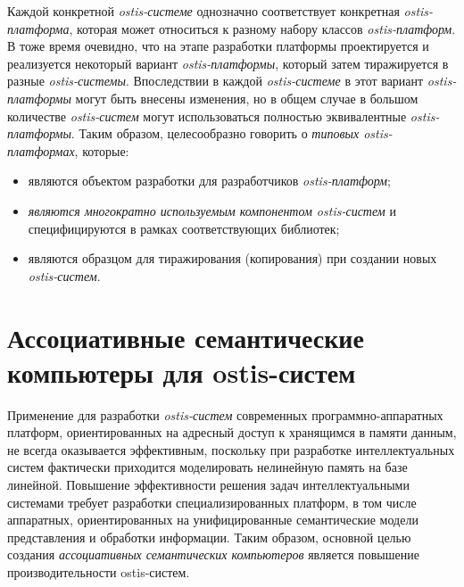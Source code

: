 Каждой конкретной \textit{ostis-системе} однозначно соответствует конкретная \textit{ostis-платформа}, которая может относиться к разному набору классов \textit{ostis-платформ}. В тоже время очевидно, что на этапе разработки платформы проектируется и реализуется некоторый вариант \textit{ostis-платформы}, который затем тиражируется в разные \textit{ostis-системы}. Впоследствии в каждой \textit{ostis-системе} в этот вариант \textit{ostis-платформы} могут быть внесены изменения, но в общем случае в большом количестве \textit{ostis-систем} могут использоваться полностью эквивалентные \textit{ostis-платформы}. Таким образом, целесообразно говорить о \textit{типовых ostis-платформах}, которые:
\begin{itemize}
	\item являются объектом разработки для разработчиков \textit{ostis-платформ};
	\item \textit{являются многократно используемым компонентом ostis-систем} и специфицируются в рамках соответствующих библиотек;
	\item являются образцом для тиражирования (копирования) при создании новых \textit{ostis-систем}.
\end{itemize}

\section{Ассоциативные семантические компьютеры для ostis-систем}

Применение для разработки \textit{ostis-систем} современных программно-аппаратных платформ, ориентированных на адресный доступ к хранящимся в памяти данным, не всегда оказывается эффективным, поскольку при разработке интеллектуальных систем фактически приходится моделировать нелинейную память на базе линейной. Повышение эффективности решения задач интеллектуальными системами требует разработки специализированных платформ, в том числе аппаратных, ориентированных на унифицированные семантические модели представления и обработки информации. Таким образом, основной целью создания \textit{ассоциативных семантических компьютеров} является повышение производительности ostis-систем.

